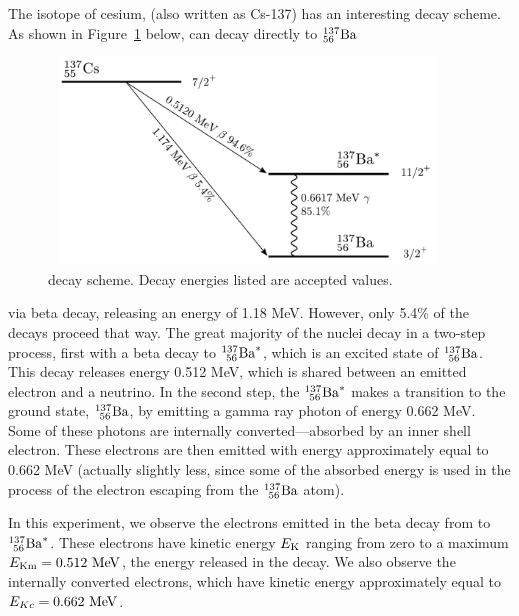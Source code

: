 \bigskip

The isotope of cesium,
\cs
(also written as Cs-137) has an interesting decay scheme.  As shown in
Figure~\ref{fig:csdecay} below, \cs can decay directly to
${}^{137}_{56}{\rm Ba}$
\begin{figure}
\begin{centering}
\includegraphics[width=4.1661in,height=2.1661in]{../images/Cs-137-decay.pdf}
\caption{ \cs decay scheme.  Decay energies listed are accepted values. }
\label{fig:csdecay}
\end{centering}
\end{figure}
via beta decay, releasing an energy of 1.18 MeV.  However, only 5.4\% of the
decays proceed that way.  The great majority of the \cs nuclei decay in a
two-step process, first with a beta decay to ${}^{137}_{\ 56}{\rm Ba}^*$, which is
an excited state of ${}^{137}_{\ 56}{\rm Ba}$.  This decay releases energy 0.512
MeV, which is shared between an emitted electron and a neutrino. In the second
step, the ${}^{137}_{\ 56}{\rm Ba}^*$ makes a transition to the ground state,
${}^{137}_{\ 56}{\rm Ba}$, by emitting a gamma ray photon of energy 0.662 MeV.
Some of these photons are internally converted---absorbed by an inner shell
electron.  These electrons are then emitted with energy approximately equal to
0.662 MeV (actually slightly less, since some of the absorbed energy is used in
the process of the electron escaping from the ${}^{137}_{\ 56}{\rm Ba}$ atom).

In this experiment, we observe the electrons emitted in the beta decay from \cs
to ${}^{137}_{\ 56}{\rm Ba}^*$.  These electrons have kinetic energy $E_{\rm K}$
ranging from zero to a maximum $E_{\rm Km} = 0.512~{\rm MeV}$, the energy
released in the decay.  We also observe the internally converted electrons,
which have kinetic energy approximately equal to $E_{Kc} = 0.662~{\rm MeV}$.  

